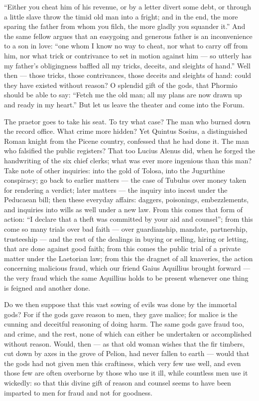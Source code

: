  ``Either you cheat him of his revenue, or by a letter divert some debt, or through a little slave throw the timid old man into a fright; and in the end, the more sparing the father from whom you filch, the more gladly you squander it.'' And the same fellow argues that an easygoing and generous father is an inconvenience to a son in love: ``one whom I know no way to cheat, nor what to carry off from him, nor what trick or contrivance to set in motion against him — so utterly has my father's obligingness baffled all my tricks, deceits, and sleights of hand.'' Well then — those tricks, those contrivances, those deceits and sleights of hand: could they have existed without reason? O splendid gift of the gods, that Phormio should be able to say: ``Fetch me the old man; all my plans are now drawn up and ready in my heart.'' But let us leave the theater and come into the Forum.

 The praetor goes to take his seat. To try what case? The man who burned down the record office. What crime more hidden? Yet Quintus Sosius, a distinguished Roman knight from the Picene country, confessed that he had done it. The man who falsified the public registers? That too Lucius Alenus did, when he forged the handwriting of the six chief clerks; what was ever more ingenious than this man? Take note of other inquiries: into the gold of Tolosa, into the Jugurthine conspiracy; go back to earlier matters — the case of Tubulus over money taken for rendering a verdict; later matters — the inquiry into incest under the Peducaean bill; then these everyday affairs: daggers, poisonings, embezzlements, and inquiries into wills as well under a new law. From this comes that form of action: ``I declare that a theft was committed by your aid and counsel''; from this come so many trials over bad faith — over guardianship, mandate, partnership, trusteeship — and the rest of the dealings in buying or selling, hiring or letting, that are done against good faith; from this comes the public trial of a private matter under the Laetorian law; from this the dragnet of all knaveries, the action concerning malicious fraud, which our friend Gaius Aquillius brought forward — the very fraud which the same Aquillius holds to be present whenever one thing is feigned and another done.

 Do we then suppose that this vast sowing of evils was done by the immortal gods? For if the gods gave reason to men, they gave malice; for malice is the cunning and deceitful reasoning of doing harm. The same gods gave fraud too, and crime, and the rest, none of which can either be undertaken or accomplished without reason. Would, then — as that old woman wishes that the fir timbers, cut down by axes in the grove of Pelion, had never fallen to earth — would that the gods had not given men this craftiness, which very few use well, and even those few are often overborne by those who use it ill, while countless men use it wickedly: so that this divine gift of reason and counsel seems to have been imparted to men for fraud and not for goodness.

